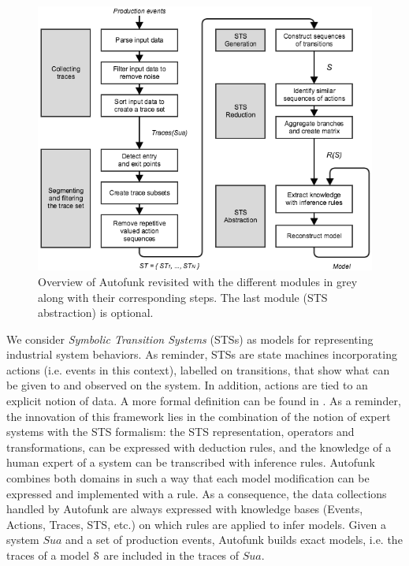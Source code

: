 \begin{figure}[ht]
\includegraphics[width=1.0\linewidth]{figures/autofunk.png}

\caption{Overview of Autofunk revisited with the different
modules in grey along with their corresponding steps. The last
module (STS abstraction) is optional.}
\label{fig:prodsystems:autofunk-overview}
\end{figure}

We consider \textit{Symbolic Transition Systems} (STSs) as models
for representing industrial system behaviors. As reminder, STSs
are state machines incorporating actions (i.e. events in this
context), labelled on transitions, that show what can be given to
and observed on the system. In addition, actions are tied to an
explicit notion of data. A more formal definition can be found
in .
As a reminder, the innovation of this framework lies in the
combination of the notion of expert systems with the STS
formalism: the STS representation, operators and transformations,
can be expressed with deduction rules, and the knowledge of a
human expert of a system can be transcribed with inference rules.
Autofunk combines both domains in such a way that each model
modification can be expressed and implemented with a rule.  As a
consequence, the data collections handled by Autofunk are always
expressed with knowledge bases (Events, Actions, Traces, STS,
etc.) on which rules are applied to infer models. Given a system
$\mathit{Sua}$ and a set of production events, Autofunk builds
exact models, i.e. the traces of a model $\EuScript{S}$ are
included in the traces of $\mathit{Sua}$.


